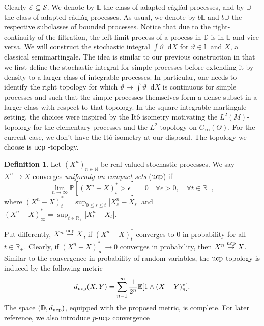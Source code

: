 \documentclass[11pt,a4paper,twoside,openany]{report}
\numberwithin{equation}{section}
\newcommand{\diff}{\mathop{}\!\mathrm{d}}
\theoremstyle{plain} %
\theoremstyle{definition} %
\newtheorem{definition}[theorem]{Definition}
\theoremstyle{remark} %
\begin{document}
Clearly \(\mathcal{E}\subseteq\mathcal{S}\). We denote by \(\mathbb{L}\) the class of adapted càglàd processes, and by \(\mathbb{D}\) the class of adapted càdlàg processes. As usual, we denote by \(b\mathbb{L}\) and \(b\mathbb{D}\) the respective subclasses of bounded processes. Notice that due to the right-continuity of the filtration, the left-limit process of a process in \(\mathbb{D}\) is in \(\mathbb{L}\) and vice versa. We will construct the stochastic integral \(\int \vartheta\diff X\) for \(\vartheta\in \mathbb{L}\) and \(X\), a classical semimartingale. The idea is similar to our previous construction in that we first define the stochastic integral for simple processes before extending it by density to a larger class of integrable processes. In particular, one needs to identify the right topology for which \(\vartheta\mapsto \int\vartheta\diff X\) is continuous for simple processes and such that the simple processes themselves form a dense subset in a larger class with respect to that topology. In the square-integrable martingale setting, the choices were inspired by the Itô isometry motivating the \(L^2(M)\)-topology for the elementary processes and the \(L^2\)-topology on \(G_{\infty}(\Theta)\). For the current case, we don't have the Itô isometry at our disposal. The topology we choose is \(\rm{ucp}\)
-topology. 
\begin{definition}\label{def:UCP convergence}
    Let \((X^n)_{n\in\mathbb{N}}\) be real-valued stochastic processes. We say \(X^n\to X\) converges \textit{uniformly on compact sets} (\(\rm{ucp}\)) if 
    \begin{equation*}
        \lim_{n\to\infty}\mathbb{P}[(X^n-X)^*_t>\epsilon]=0\quad\forall\epsilon>0,\quad\forall t\in\mathbb{R}_+,
    \end{equation*}
    where \((X^n-X)^*_t=\sup_{0\leq s\leq t}|X^n_s-X_s|\) and  \((X^n-X)^*_{\infty}=\sup_{t\in\mathbb{R}_+}|X^n_t-X_t|\). 
\end{definition}
Put differently, \(X^n\overset{\rm{ucp}}{\to}X\), if \((X^n-X)^*_t\) converges to \(0\) in probability for all \(t\in\mathbb{R}_+\). 
Clearly, if \((X^n-X)_{\infty}^*\to 0\) converges in probability, then \(X^n\overset{\rm{ucp}}{\to}X\). Similar to the convergence in probability of random variables, the \(\rm{ucp}\)-topology is induced by the following metric
\begin{equation*}
    d_{\rm{ucp}}(X,Y)=\sum_{n=1}^{\infty}\frac{1}{2^n}\mathbb{E}[1\wedge(X-Y)^*_n].
\end{equation*}
The space \((\mathbb{D},d_{\rm{ucp}})\), equipped with the proposed metric, is complete. For later reference, we also introduce \(p\)-\(\rm{ucp}\) convergence
\end{document}

